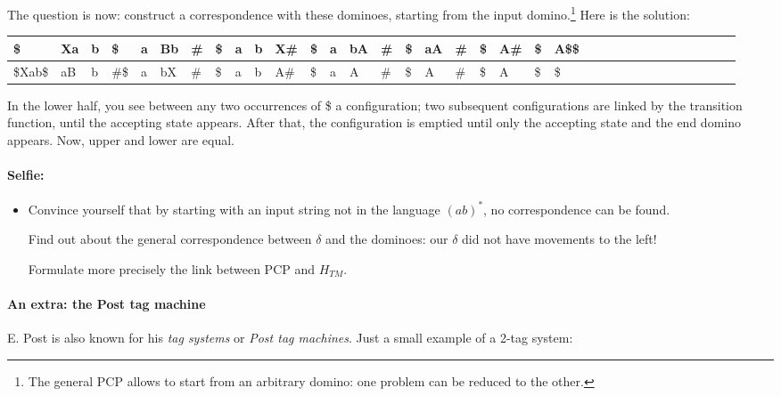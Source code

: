 The question is now: construct a correspondence with these dominoes,
starting from the input domino.\footnote{The general PCP allows to
  start from an arbitrary domino: one problem can be reduced to the
  other.} Here is the solution:


{\footnotesize
\begin{tabular}{|l|l|l|l|l|l|l|l|l|l|l|l|l|l|l|l|l|l|l|l|l|l|l|l|l|l|l|l|l|l|l|l|l|l|}
\hline
\$      & Xa & b & \$   & a & Bb & \# & \$ & a & b & X\# & \$ &  a & bA & \# & \$ & aA & \# & \$ & A\# & \$ & A\$\$\\ \hline
\$Xab\$ & aB & b & \#\$ & a & bX & \# & \$ & a & b & A\# & \$ &  a &  A & \# & \$ & A  & \# & \$ & A   & \$ & \$  \\
\hline
\end{tabular}
}


In the lower half, you see between any two occurrences of \$ a
configuration; two subsequent configurations are linked by the
transition function, until the accepting state appears. After that,
the configuration is emptied until only the accepting state and the
end domino appears. Now, upper and lower are equal.


\paragraph{Selfie:}
\begin{itemize}
\item[]
Convince yourself that by starting with an input string not in the
language $(ab)^*$, no correspondence can be found.

Find out about the general correspondence between $\delta$ and the
dominoes: our $\delta$ did not have movements to the left!

Formulate more precisely the link between PCP and $H_{TM}$.
\end{itemize}



\paragraph{An extra: the Post tag machine}

E. Post is also known for his {\em tag systems} or {\em Post tag
  machines}. Just a small example of a 2-tag system:

